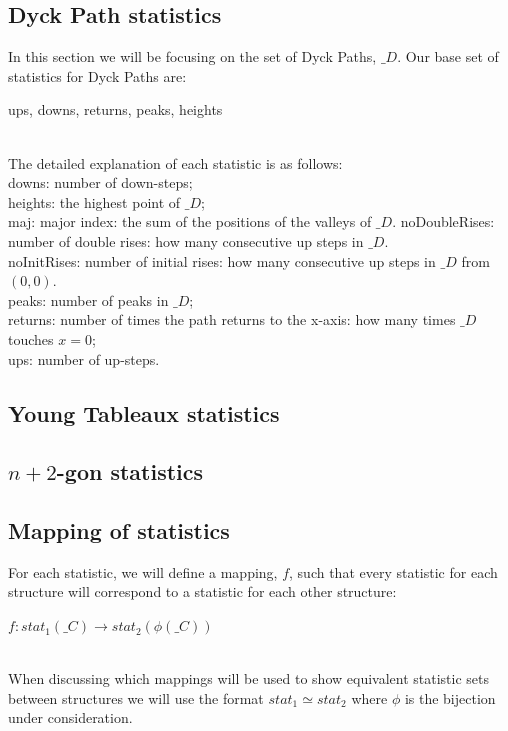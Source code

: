 \documentclass[12pt]{article}
\begin{document}
\subsection{Dyck Path statistics}
In this section we will be focusing on the set of Dyck Paths, $\mathfrak_{D}$. Our base set of statistics for Dyck Paths are:\\ \centerline{ups, downs, returns, peaks, heights}\\
The detailed explanation of each statistic is as follows:\\
downs: number of down-steps;\\
heights: the highest point of $\mathfrak_{D}$;\\
maj: major index: the sum of the positions of the valleys of $\mathfrak_{D}$.
noDoubleRises: number of double rises: how many consecutive up steps in $\mathfrak_{D}$.\\
noInitRises: number of initial rises: how many consecutive up steps in $\mathfrak_{D}$ from $(0,0)$.\\
peaks: number of peaks in $\mathfrak_{D}$;\\
returns: number of times the path returns to the x-axis: how many times $\mathfrak_{D}$ touches $x=0$;\\
ups: number of up-steps.\\

\subsection{Young Tableaux statistics}

\subsection{$n+2$-gon statistics}

\subsection{Mapping of statistics}
For each statistic, we will define a mapping, $f$, such that every statistic for each structure will correspond to a statistic for each other structure:\\
\centerline{$f: stat_1({\mathfrak_{C}}) \rightarrow stat_2(\phi(\mathfrak_{C}))$}\\
When discussing which mappings will be used to show equivalent statistic sets between structures we will use the format $stat_1 \simeq stat_2$ where $\phi$ is the bijection under consideration.
\end{document}
